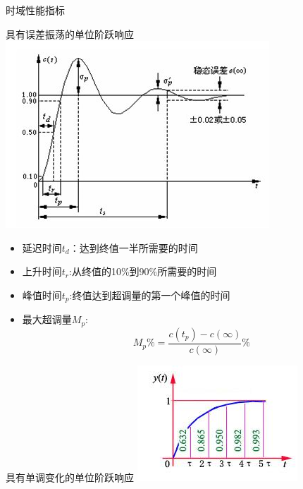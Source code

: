 \begin{frame}{时域性能指标}
\begin{block}{具有误差振荡的单位阶跃响应}
\includegraphics[scale=0.8]{danweijiyao}
\end{block}
\end{frame}
\begin{frame}
\begin{block}{}
\begin{itemize}
\item<+-> 延迟时间$t_d$：达到终值一半所需要的时间
\item<+-> 上升时间$t_r$:从终值的10\%到90\%所需要的时间
\item<+-> 峰值时间$t_p$:终值达到超调量的第一个峰值的时间
\item<+-> 最大超调量$M_p$:
\[M_p\%=\frac{c(t_p)-c(\infty)}{c(\infty)}\%\]
\end{itemize}
\end{block}
\end{frame}
\begin{frame}
\begin{block}{具有单调变化的单位阶跃响应}
\includegraphics[scale=1.2]{onejieyaoimpulse}
\end{block}
\end{frame}